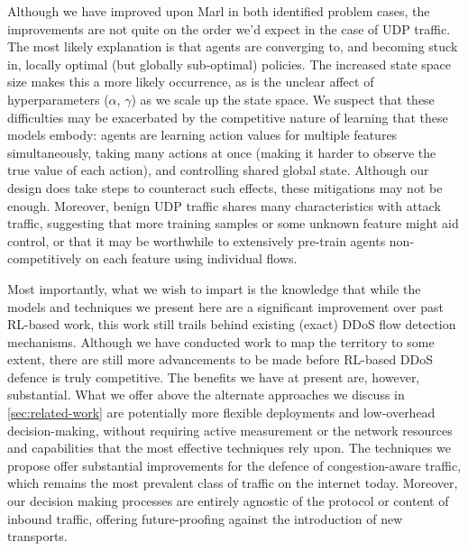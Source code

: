 \documentclass[10pt, times, comsoc]{IEEEtran}
\begin{document}
Although we have improved upon Marl in both identified problem cases, the improvements are not quite on the order we'd expect in the case of UDP traffic.
The most likely explanation is that agents are converging to, and becoming stuck in, locally optimal (but globally sub-optimal) policies.
The increased state space size makes this a more likely occurrence, as is the unclear affect of hyperparameters ($\alpha$, $\gamma$) as we scale up the state space.
We suspect that these difficulties may be exacerbated by the competitive nature of learning that these models embody: agents are learning action values for multiple features simultaneously, taking many actions at once (making it harder to observe the true value of each action), and controlling shared global state.
Although our design does take steps to counteract such effects, these mitigations may not be enough.
Moreover, benign UDP traffic shares many characteristics with attack traffic, suggesting that more training samples or some unknown feature might aid control, or that it may be worthwhile to extensively pre-train agents non-competitively on each feature using individual flows.


Most importantly, what we wish to impart is the knowledge that while the models and techniques we present here are a significant improvement over past RL-based work, this work still trails behind existing (exact) DDoS flow detection mechanisms.
Although we have conducted work to map the territory to some extent, there are still more advancements to be made before RL-based DDoS defence is truly competitive.
The benefits we have at present are, however, substantial.
What we offer above the alternate approaches we discuss in \cref{sec:related-work} are potentially more flexible deployments and low-overhead decision-making, without requiring active measurement or the network resources and capabilities that the most effective techniques rely upon.
The techniques we propose offer substantial improvements for the defence of congestion-aware traffic, which remains the most prevalent class of traffic on the internet today.
Moreover, our decision making processes are entirely agnostic of the protocol or content of inbound traffic, offering future-proofing against the introduction of new transports.
\end{document}
